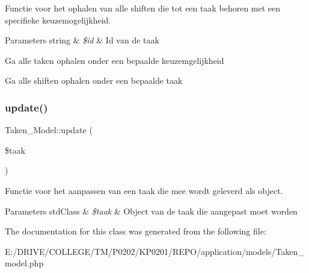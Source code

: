Functie voor het ophalen van alle shiften die tot een taak behoren met een specifieke keuzemogelijkheid. 
\begin{DoxyParams}[1]{Parameters}
string & {\em \$id} & Id van de taak \\
\hline
\end{DoxyParams}
Ga alle taken ophalen onder een bepaalde keuzemgelijkheid

Ga alle shiften ophalen onder een bepaalde taak \mbox{\label{class_taken___model_ab4e93ac196a1aeb83582faa332619c86}} 
\subsubsection{\texorpdfstring{update()}{update()}}
{\footnotesize\ttfamily Taken\+\_\+\+Model\+::update (\begin{DoxyParamCaption}\item[{}]{\$taak }\end{DoxyParamCaption})}

Functie voor het aanpassen van een taak die mee wordt geleverd als object. 
\begin{DoxyParams}[1]{Parameters}
std\+Class & {\em \$taak} & Object van de taak die aangepast moet worden \\
\hline
\end{DoxyParams}


The documentation for this class was generated from the following file\+:\begin{DoxyCompactItemize}
\item 
E\+:/\+D\+R\+I\+V\+E/\+C\+O\+L\+L\+E\+G\+E/\+T\+M/\+P0202/\+K\+P0201/\+R\+E\+P\+O/application/models/Taken\+\_\+model.\+php\end{DoxyCompactItemize}
